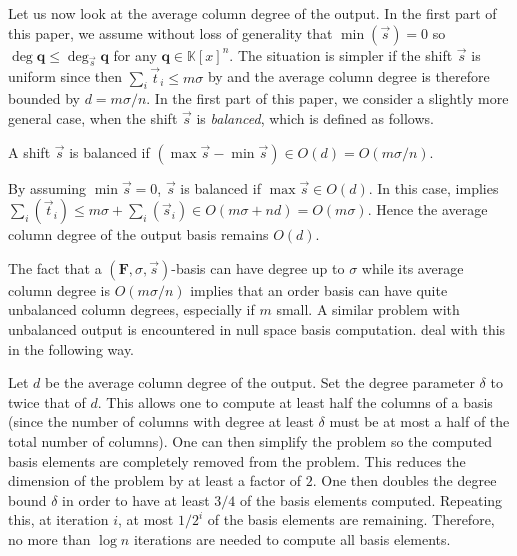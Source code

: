 Let us now look at the average column degree of the output. In the
first part of this paper, we assume without loss of generality that
$\min\left(\vec{s}\right)=0$ so $\deg\mathbf{q}\le\deg_{\vec{s}}\mathbf{q}$
for any $\mathbf{q}\in\mathbb{K}\left[x\right]^{n}$. The situation
is simpler if the shift $\vec{s}$ is uniform since then $\sum_{i}\vec{t}_{i}\le m\sigma$
by  and the average column degree is therefore
bounded by $d=m\sigma/n$. In the first part of this paper, we consider
a slightly more general case, when the shift $\vec{s}$ is \emph{balanced},
which is defined as follows. 
\begin{defn}
A shift $\vec{s}$ is balanced if $(\max\vec{s}-\min\vec{s})\in O(d)=O(m\sigma/n)$. 
\end{defn}
By assuming $\min\vec{s}=0$, $\vec{s}$ is balanced if $\max\vec{s}\in O(d)$.
In this case,  implies $\sum_{i}\left(\vec{t}_{i}\right)\le m\sigma+\sum_{i}\left(\vec{s}_{i}\right)\in O\left(m\sigma+nd\right)=O\left(m\sigma\right)$.
Hence the average column degree of the output basis remains $O\left(d\right)$.



%
\begin{comment}
In fact, if $\mathbf{F}\left(0\right)$ is full rank, the sum of column
degrees of an order $\sigma$ order basis is exactly $m\sigma$, as
we need exactly $\sigma$ iterations, each increases the sum of the
column degrees by exactly $m$. 
\end{comment}
{}

The fact that a $\left(\mathbf{F},\sigma,\vec{s}\right)$-basis can
have degree up to $\sigma$ while its average column degree is $O\left(m\sigma/n\right)$
implies that an order basis can have quite unbalanced column degrees,
especially if $m$ small. A similar problem with unbalanced output
is encountered in null space basis computation. \citet{storjohann-villard:2005}
deal with this in the following way.

Let $d$ be the average column degree of the output. Set the degree
parameter $\delta$ to twice that of $d$. This allows one to compute
at least half the columns of a basis (since the number of columns
with degree at least $\delta$ must be at most a half of the total
number of columns). One can then simplify the problem so the computed
basis elements are completely removed from the problem. This reduces
the dimension of the problem by at least a factor of $2$. One then
doubles the degree bound $\delta$ in order to have at least $3/4$
of the basis elements computed. Repeating this, at iteration $i$,
at most $1/2^{i}$ of the basis elements are remaining. Therefore,
no more than $\log n$ iterations are needed to compute all basis
elements.

